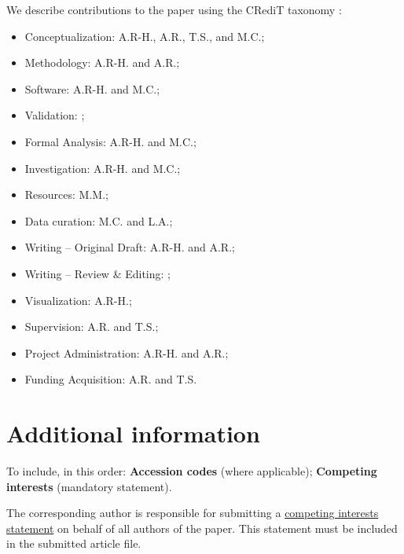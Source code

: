 \documentclass[fleqn,10pt]{wlscirep}
\begin{document}

We describe contributions to the paper using the CRediT taxonomy \cite{brand2015-vd}:
\begin{itemize}
    \item Conceptualization: A.R-H., A.R., T.S., and M.C.;
    \item Methodology: A.R-H. and A.R.;
    \item Software: A.R-H. and M.C.;
    \item Validation: ;
    \item Formal Analysis: A.R-H. and M.C.;
    \item Investigation: A.R-H. and M.C.;
    \item Resources: M.M.;
    \item Data curation: M.C. and L.A.;
    \item Writing – Original Draft: A.R-H. and A.R.;
    \item Writing – Review \& Editing: ;
    \item Visualization: A.R-H.;
    \item Supervision: A.R. and T.S.;
    \item Project Administration: A.R-H. and A.R.;
    \item Funding Acquisition: A.R. and T.S.
\end{itemize}

\section*{Additional information}

To include, in this order: \textbf{Accession codes} (where applicable); \textbf{Competing interests} (mandatory statement). 

The corresponding author is responsible for submitting a \href{http://www.nature.com/srep/policies/index.html#competing}{competing interests statement} on behalf of all authors of the paper. This statement must be included in the submitted article file.



\end{document}
